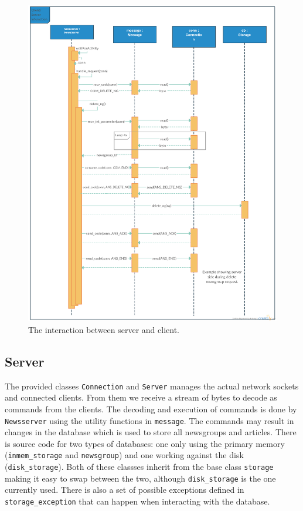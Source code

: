 \documentclass[a4paper]{article}
\begin{document}
\begin{figure}[!h]
    \centering
    \includegraphics[width=1.25\textwidth]{sequence_uml3.png}
    \caption{The interaction between server and client.}
    \label{fig:sequence}
\end{figure}

\subsection{Server}
\label{subsec:server}
The provided classes \texttt{Connection} and \texttt{Server} manages the actual network sockets and connected clients. From them we receive a stream of bytes to decode as commands from the clients. The decoding and execution of commands is done by \texttt{Newsserver} using the utility functions in \texttt{message}. The commands may result in changes in the database which is used to store all newsgroups and articles. There is source code for two types of databases: one only using the primary memory (\texttt{inmem\_storage} and \texttt{newsgroup}) and one working against the disk (\texttt{disk\_storage}). Both of these classses inherit from the base class \texttt{storage} making it easy to swap between the two, although \texttt{disk\_storage} is the one currently used. There is also a set of possible exceptions defined in \texttt{storage\_exception} that can happen when interacting with the database.
\end{document}
